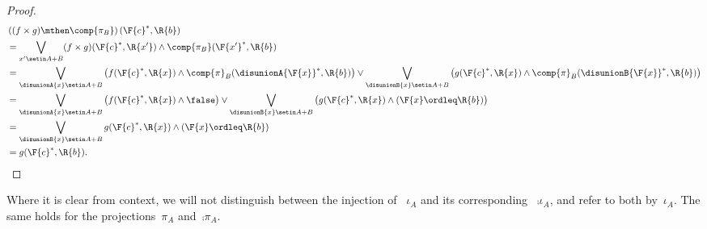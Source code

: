 \begin{proof}
\begin{equation}
\begin{aligned}
             & \left((f\times g)\mthen \comp{\pi_B}\right)(\F{c}^*,\R{b}) \\
             & =\bigvee_{x'\setin A+B} (f\times g)(\F{c}^*,\R{x'}) \wedge \comp{\pi_B}(\F{x'}^*,\R{b}) \\
             & =\bigvee_{\disunionA{x}\setin A+B}\left( f(\F{c}^*,\R{x}) \wedge \comp{\pi}_B(\disunionA{\F{x}}^*,\R{b})\right) \vee
            \bigvee_{\disunionB{x}\setin A+B}\left( g(\F{c}^*,\R{x}) \wedge \comp{\pi}_B(\disunionB{\F{x}}^*,\R{b})\right) \\
             & =\bigvee_{\disunionA{x}\setin A+B}\left( f(\F{c}^*,\R{x}) \wedge \false \right) \vee
            \bigvee_{\disunionB{x}\setin A+B}\left( g(\F{c}^*,\R{x}) \wedge (\F{x}\ordleq \R{b}) \right) \\
             & =\bigvee_{\disunionB{x}\setin A+B} g(\F{c}^*,\R{x}) \wedge (\F{x}\ordleq \R{b}) \\
             & =g(\F{c}^*,\R{b}).
        \end{aligned}
    \end{equation}
\end{proof}

\begin{remark}
    Where it is clear from context, we will not distinguish between the injection of ~$\iota_A$ and its corresponding ~$\comp{\iota_A}$, and refer to both by~$\iota_A$.
    The same holds for the projections~$\pi_A$ and~$\comp{\pi_A}$.
\end{remark}

